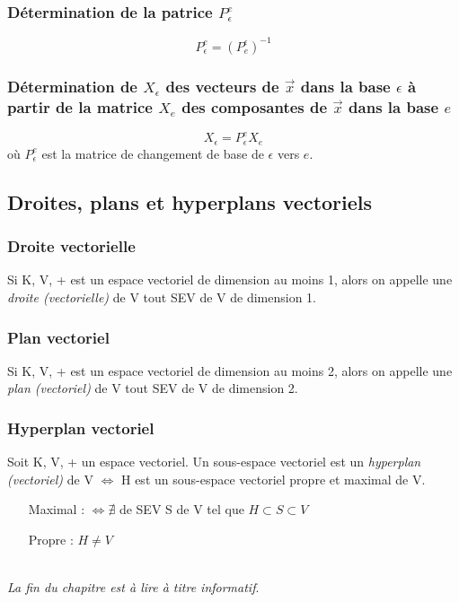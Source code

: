 \documentclass[12pt, a4paper, openany]{article}
\begin{document}
\subsubsection{Détermination de la patrice $P_\epsilon^e$}
$$P_\epsilon^e = (P_e^\epsilon)^{-1}$$

\subsubsection{Détermination de $X_\epsilon$ des vecteurs de $\vec{x}$ dans la base $\epsilon$ à partir de la matrice $X_e$ des composantes de $\vec{x}$ dans la base $e$}
$$X_\epsilon = P_\epsilon^e X_e$$
où $P_\epsilon^e$ est la matrice de changement de base de $\epsilon$ vers $e$.

\subsection{Droites, plans et hyperplans vectoriels}
\subsubsection{Droite vectorielle}
Si K, V, + est un espace vectoriel de dimension au moins 1, alors on appelle une \textit{droite (vectorielle)} de V tout SEV de V de dimension 1.

\subsubsection{Plan vectoriel}
Si K, V, + est un espace vectoriel de dimension au moins 2, alors on appelle une \textit{plan (vectoriel)} de V tout SEV de V de dimension 2.

\subsubsection{Hyperplan vectoriel}
Soit K, V, + un espace vectoriel. Un sous-espace vectoriel est un \textit{hyperplan (vectoriel)} de V $\Leftrightarrow$ H est un sous-espace vectoriel propre et maximal de V.\\
\begin{itemize}
\item[Maximal] : $\Leftrightarrow \nexists$ de SEV S de V tel que $H\subset S \subset V$
\item[Propre] : $H \neq V$
\end{itemize}
\ \\
\textit{La fin du chapitre est à lire à titre informatif}.
\end{document}
